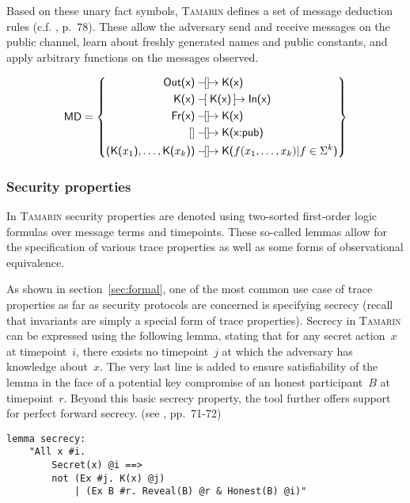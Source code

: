 \noindent
Based on these unary fact symbols, \textsc{Tamarin} defines a set of message deduction rules (c.f. \cite{meier2013advancing}, p.~78).
These allow the adversary send and receive messages on the public channel, learn about freshly generated names and public constants, and apply arbitrary functions on the messages observed.

\begin{equation*}
    \textsf{MD} = \left\{
        \begin{aligned}
            \textsf{Out(x)} &\ltracerule\rtracerule \textsf{K(x)}\\
            \textsf{K(x)} &\tracerule{\textsf{K(x)}} \textsf{In(x)}\\
            \textsf{Fr(x)} &\ltracerule\rtracerule \textsf{K(x)}\\
            [] &\ltracerule\rtracerule \textsf{K(x:pub)}\\
            \textsf{(K(}x_1\textsf{)}, \ldots, \textsf{K(}x_k\textsf{))} &\ltracerule\rtracerule \textsf{K(}f(x_1, \ldots, x_k) | f \in \Sigma^k\textsf{)}
        \end{aligned}
    \right\}
\end{equation*}

\subsubsection{Security properties}

In \textsc{Tamarin} security properties are denoted using two-sorted first-order logic formulas over message terms and timepoints.
These so-called lemmas allow for the specification of various trace properties as well as some forms of observational equivalence.

\noindent
As shown in section~\ref{sec:formal}, one of the most common use case of trace properties as far as security protocols are concerned is specifying secrecy (recall that invariants are simply a special form of trace properties).
Secrecy in \textsc{Tamarin} can be expressed using the following lemma, stating that for any secret action~$x$ at timepoint~$i$, there exsists no timepoint~$j$ at which the adversary has knowledge about~$x$.
The very last line is added to ensure satisfiability of the lemma in the face of a potential key compromise of an honest participant~$B$ at timepoint~$r$.
Beyond this basic secrecy property, the tool further offers support for perfect forward secrecy. (see \cite{tamarin2019manual}, pp.~71-72)

\begin{lstlisting}[caption={Tamarin secrecy query, according to \cite{tamarin2019manual}, p.~72},label={lst:tamarin-secrecy}]
lemma secrecy:
    "All x #i.
        Secret(x) @i ==>
        not (Ex #j. K(x) @j)
            | (Ex B #r. Reveal(B) @r & Honest(B) @i)"
\end{lstlisting}

